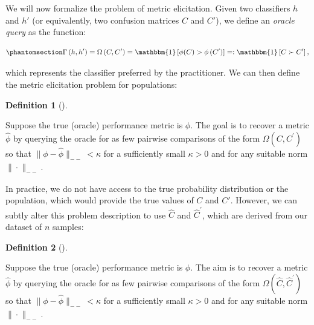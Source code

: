 \documentclass[
  letterpaper,
  numbers=noenddot,
  DIV=11]{scrreprt}
\theoremstyle{plain}
\theoremstyle{definition}
\newtheorem{definition}{Definition}[chapter]
\theoremstyle{remark}
\begin{document}
We will now formalize the problem of metric elicitation. Given two
classifiers \(h\) and \(h'\) (or equivalently, two confusion matrices
\(C\) and \(C'\)), we define an \emph{oracle query} as the function:

\begin{equation}\phantomsection\label{eq-oracle}{\Gamma\left(h, h^{\prime}\right)=\Omega\left(C, C^{\prime}\right)=\mathbbm{1}\left[\phi(C)>\phi\left(C^{\prime}\right)\right]=: \mathbbm{1} \left[C \succ C^{\prime}\right],}\end{equation}

which represents the classifier preferred by the practitioner. We can
then define the metric elicitation problem for populations:

\begin{tcolorbox}[colframe=.grey, title=\faPenSquare \enspace Definition]

\begin{definition}[]\protect\hypertarget{def-def3.1}{}\label{def-def3.1}

Suppose the true (oracle) performance metric is \(\phi\). The goal is to
recover a metric \(\hat{\phi}\) by querying the oracle for as few
pairwise comparisons of the form \(\Omega\left(C, C^{\prime}\right)\) so
that \(\|\phi - \hat{\phi}\|_{--} < \kappa\) for a sufficiently small
\(\kappa > 0\) and for any suitable norm \(\|\cdot\|_{--}\).

\end{definition}

\end{tcolorbox}

In practice, we do not have access to the true probability distribution
or the population, which would provide the true values of \(C\) and
\(C'\). However, we can subtly alter this problem description to use
\(\hat{C}\) and \(\hat{C}^{\prime}\), which are derived from our dataset
of \(n\) samples:

\begin{tcolorbox}[colframe=.grey, title=\faPenSquare \enspace Definition]

\begin{definition}[]\protect\hypertarget{def-def3.2}{}\label{def-def3.2}

Suppose the true (oracle) performance metric is \(\phi\). The aim is to
recover a metric \(\hat{\phi}\) by querying the oracle for as few
pairwise comparisons of the form
\(\Omega\left(\hat{C}, \hat{C}^{\prime}\right)\) so that
\(\|\phi - \hat{\phi}\|_{--} < \kappa\) for a sufficiently small
\(\kappa > 0\) and for any suitable norm \(\|\cdot\|_{--}\).

\end{definition}

\end{tcolorbox}
\end{document}
